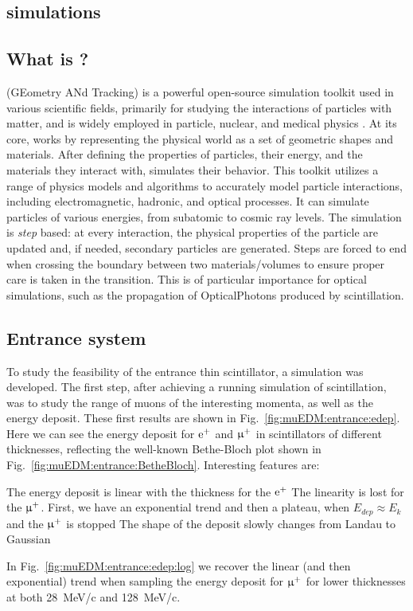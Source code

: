 \begin{refsection}
\section{\gf simulations}
    \label{sec:muEDM:entrance:sim}
    \subsection{What is \gf?}
        \gf (GEometry ANd Tracking) is a powerful open-source simulation toolkit used in various scientific fields, primarily for studying the interactions of particles with matter, and is widely employed in particle, nuclear, and medical physics \cite{GEANT4:2002}. 
        At its core, \gf works by representing the physical world as a set of geometric shapes and materials. 
        After defining the properties of particles, their energy, and the materials they interact with, \gf simulates their behavior. 
        This toolkit utilizes a range of physics models and algorithms to accurately model particle interactions, including electromagnetic, hadronic, and optical processes. It can simulate particles of various energies, from subatomic to cosmic ray levels.
        The simulation is \textit{step} based: at every interaction, the physical properties of the particle are updated and, if needed, secondary particles are generated. 
        Steps are forced to end when crossing the boundary between two materials/volumes to ensure proper care is taken in the transition. 
        This is of particular importance for optical simulations, such as the propagation of OpticalPhotons produced by scintillation.

    \subsection{Entrance system}
        To study the feasibility of the entrance thin scintillator, a \gf simulation was developed.
        The first step, after achieving a running simulation of scintillation, was to study the range of muons of the interesting momenta, as well as the energy deposit. 
        These first results are shown in Fig.~\ref{fig:muEDM:entrance:edep}.
        Here we can see the energy deposit for $\text{e}^+$ and $\upmu^+$ in scintillators of different thicknesses, reflecting the well-known Bethe-Bloch plot shown in Fig.~\ref{fig:muEDM:entrance:BetheBloch}. 
        Interesting features are:
        \begin{outline}
            \1 The energy deposit is linear with the thickness for the $\text{e}^+$
            \1 The linearity is lost for the $\upmu^+$. First, we have an exponential trend and then a plateau, when $E_{dep}\approx E_k$ and the $\upmu^+$ is stopped
            \1 The shape of the deposit slowly changes from Landau to Gaussian
        \end{outline}
        In Fig.~\ref{fig:muEDM:entrance:edep:log} we recover the linear (and then exponential) trend when sampling the energy deposit for $\upmu^+$ for lower thicknesses at both \SI{28}{MeV/c} and \SI{128}{MeV/c}.



\end{refsection}
